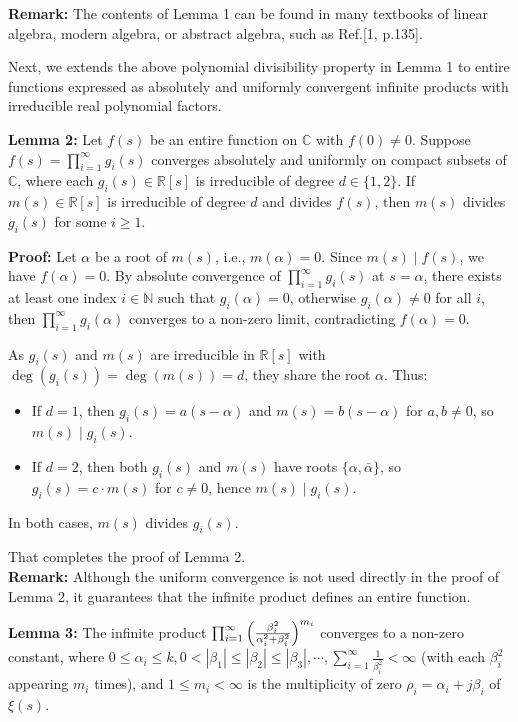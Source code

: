 \documentclass[12pt]{article}
\begin{document}
\textbf{Remark:} The contents of Lemma 1 can be found in many textbooks of linear algebra, modern algebra,  or abstract algebra, such as Ref.[1, p.135].

Next, we extends the above polynomial divisibility property in Lemma 1 to entire functions expressed as absolutely and uniformly convergent infinite products with irreducible real polynomial factors.

\textbf{Lemma 2:} Let $f(s)$ be an entire function on $\mathbb{C}$ with $f(0) \neq 0$.
Suppose $f(s)=\prod_{i=1}^{\infty} g_i(s)$ converges absolutely and
uniformly on compact subsets of $\mathbb{C}$, where each
$g_i(s)\in\mathbb{R}[s]$ is irreducible of degree
$d\in\{1,2\}$. If $m(s)\in\mathbb{R}[s]$ is irreducible
of degree $d$ and divides $f(s)$, then $m(s)$ divides $g_i(s)$ for some
$i\geq 1$.


\textbf{Proof:}
Let \(\alpha\) be a root of \( m(s) \), i.e., \( m(\alpha) =0 \). Since \( m(s) \mid f(s) \), we have \( f(\alpha) = 0 \). By absolute convergence of \(\prod_{i=1}^{\infty} g_i(s)\) at $s=\alpha$, there exists at least one index \( i \in \mathbb{N} \) such that \( g_i(\alpha) = 0 \), otherwise \( g_i(\alpha) \neq 0 \) for all $i$, then \(\prod_{i=1}^{\infty} g_i(\alpha)\) converges to a non-zero limit, contradicting \( f(\alpha) = 0 \).

As \( g_i(s) \) and \( m(s) \) are irreducible in \(\mathbb{R}[s]\) with \(\deg(g_i(s)) = \deg(m(s)) = d\), they share the root \(\alpha\). Thus:
\begin{itemize}
  \item If \( d = 1 \), then \( g_i(s) = a(s - \alpha) \) and \( m(s) = b(s - \alpha) \) for \( a, b \neq 0 \), so \( m(s) \mid g_i(s) \).
  \item If \( d = 2 \), then both \( g_i(s) \) and \( m(s) \) have roots \(\{\alpha, \bar\alpha\}\), so \( g_i(s) = c \cdot m(s) \) for \( c \neq 0 \), hence \( m(s) \mid g_i(s) \).
\end{itemize}
In both cases, \( m(s) \) divides \( g_i(s) \).

That completes the proof of Lemma 2.\\

\textbf{Remark:} Although the uniform convergence is not used directly in the proof of Lemma 2, it guarantees that the infinite product defines an entire function.


\textbf{Lemma 3:} The infinite product $\prod_{i=1}^{\infty} \Big{(}\frac{\beta_i^2}{\alpha_i^2 + \beta_i^2}\Big{)}^{m_i}$
converges to a non-zero constant, where $ 0\leq \alpha_i \leq k, 0<|\beta_1| \leq|\beta_2|\leq|\beta_3|, \cdots, \sum_{i=1}^{\infty} \frac{1}{\beta_i^2} < \infty$ (with each
$\beta_i^2$ appearing $m_i$ times), and $1\leq m_i< \infty$ is the multiplicity of zero $\rho_i=\alpha_i + j\beta_i$ of $\xi(s)$.
\end{document}
